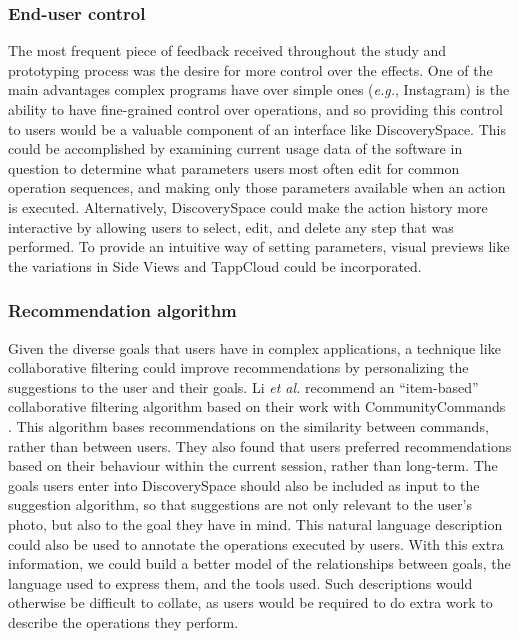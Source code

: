 \subsubsection{End-user control}
The most frequent piece of feedback received throughout the study and prototyping process was the desire for more control over the effects. One of the main advantages complex programs have over simple ones (\textit{e.g.}, Instagram) is the ability to have fine-grained control over operations, and so providing this control to users would be a valuable component of an interface like Discovery\-Space. This could be accomplished by examining current usage data of the software in question to determine what parameters users most often edit for common operation sequences, and making only those parameters available when an action is executed. Alternatively, Discovery\-Space could make the action history more interactive by allowing users to select, edit, and delete any step that was performed. To provide an intuitive way of setting parameters, visual previews like the variations in Side Views \cite{Terry2002} and TappCloud \cite{Laput2012} could be incorporated. 

\subsubsection{Recommendation algorithm}
Given the diverse goals that users have in complex applications, a technique like collaborative filtering could improve recommendations by personalizing the suggestions to the user and their goals. Li \textit{et al.} recommend an ``item-based'' collaborative filtering algorithm based on their work with CommunityCommands \cite{Li2011}. This algorithm bases recommendations on the similarity between commands, rather than between users. They also found that users preferred recommendations based on their behaviour within the current session, rather than long-term. The goals users enter into Discovery\-Space should also be included as input to the suggestion algorithm, so that suggestions are not only relevant to the user's photo, but also to the goal they have in mind. This natural language description could also be used to annotate the operations executed by users. With this extra information, we could build a better model of the relationships between goals, the language used to express them, and the tools used. Such descriptions would otherwise be difficult to collate, as users would be required to do extra work to describe the operations they perform.

